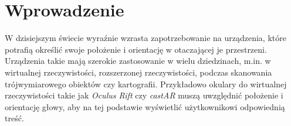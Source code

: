 
\chapter*{Wprowadzenie}

W dzisiejszym świecie wyraźnie wzrasta zapotrzebowanie na urządzenia,
które potrafią określić swoje położenie i orientację w otaczającej je przestrzeni.
Urządzenia takie mają szerokie zastosowanie w wielu dziedzinach, m.in. w
wirtualnej rzeczywistości, rozszerzonej rzeczywistości, 
 podczas skanowania trójwymiarowego obiektów czy kartografii.
Przykładowo okulary do wirtualnej rzeczywistości takie jak \textit{Oculus Rift} \cite{bib:OculusRift} 
czy \textit{castAR} \cite{bib:castAR}
muszą uwzględnić położenie i orientację głowy, aby na tej podstawie wyświetlić użytkownikowi 
odpowiednią treść. 


